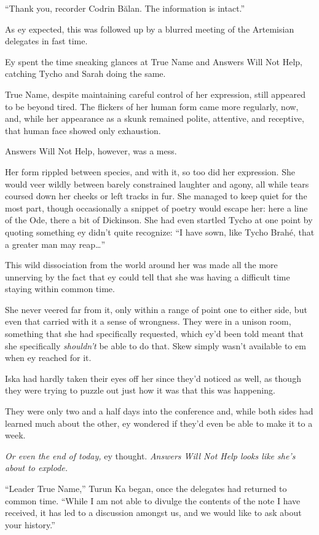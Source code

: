 ``Thank you, recorder Codrin Bălan. The information is intact.''

As ey expected, this was followed up by a blurred meeting of the Artemisian delegates in fast time.

Ey spent the time sneaking glances at True Name and Answers Will Not Help, catching Tycho and Sarah doing the same.

True Name, despite maintaining careful control of her expression, still appeared to be beyond tired. The flickers of her human form came more regularly, now, and, while her appearance as a skunk remained polite, attentive, and receptive, that human face showed only exhaustion.

Answers Will Not Help, however, was a mess.

Her form rippled between species, and with it, so too did her expression. She would veer wildly between barely constrained laughter and agony, all while tears coursed down her cheeks or left tracks in fur. She managed to keep quiet for the most part, though occasionally a snippet of poetry would escape her: here a line of the Ode, there a bit of Dickinson. She had even startled Tycho at one point by quoting something ey didn't quite recognize: ``I have sown, like Tycho Brahé, that a greater man may reap\ldots{}''

This wild dissociation from the world around her was made all the more unnerving by the fact that ey could tell that she was having a difficult time staying within common time.

She never veered far from it, only within a range of point one to either side, but even that carried with it a sense of wrongness. They were in a unison room, something that she had specifically requested, which ey'd been told meant that she specifically \emph{shouldn't} be able to do that. Skew simply wasn't available to em when ey reached for it.

Iska had hardly taken their eyes off her since they'd noticed as well, as though they were trying to puzzle out just how it was that this was happening.

They were only two and a half days into the conference and, while both sides had learned much about the other, ey wondered if they'd even be able to make it to a week.

\emph{Or even the end of today,} ey thought. \emph{Answers Will Not Help looks like she's about to explode.}

``Leader True Name,'' Turun Ka began, once the delegates had returned to common time. ``While I am not able to divulge the contents of the note I have received, it has led to a discussion amongst us, and we would like to ask about your history.''

